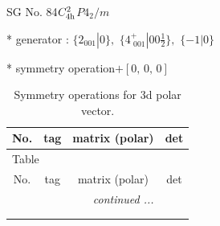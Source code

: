 \documentclass[fleqn,8pt]{jsarticle}
\begin{document}
\setcounter{MaxMatrixCols}{32}

\renewcommand{\tablename}{Table~}
\renewcommand{\figurename}{Figure~}
\begin{center}
\LARGE
SG No. 84\quad$C_{\rm 4h}^{2}$\quad$P4_2/m$\quad[ tetragonal ]
\end{center}

* generator : $\{2{}_{001}|0\},\,\,\{4^{+}_{\,\,001}|0 0 \frac{1}{2}\},\,\,\{-1|0\}$

* symmetry operation\quad$+\left[ 0,\, 0,\, 0 \right]$
\renewcommand{\arraystretch}{1.3}
\begin{longtable}{cccc}
\caption{Symmetry operations for 3d polar vector.}
 \\
 \hline \hline
No. & tag & matrix (polar) & det \\ \hline \endfirsthead

\multicolumn{3}{l}{\tablename\ \thetable{}} \\
 \hline \hline
No. & tag & matrix (polar) & det \\ \hline \endhead

 \hline \hline
\multicolumn{3}{r}{\footnotesize\it continued ...} \\ \endfoot

 \hline \hline
\multicolumn{3}{r}{} \\ \endlastfoot


\end{longtable}
\end{document}
